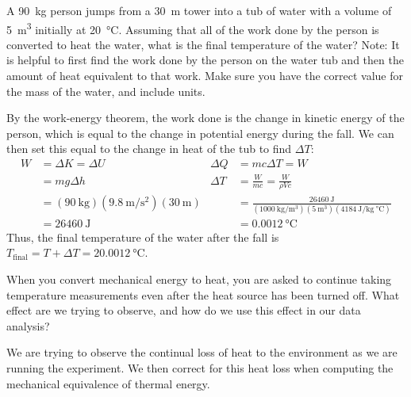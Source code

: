 \documentclass[addpoints]{physlabs}
\date{\today}
\begin{document}
\maketitle

\begin{prelab}

    \filbreak
    \question[1] A \qty{90}{\kilo\gram} person jumps from a \qty{30}{\meter} tower into a tub of water with a volume of \qty{5}{\meter^3} initially at \qty{20}{\celsius}. Assuming that all of the work done by the person is converted to heat the water, what is the final temperature of the water? Note: It is helpful to first find the work done by the person on the water tub and then the amount of heat equivalent to that work. Make sure you have the correct value for the mass of the water, and include units.
    \begin{solution}[8cm]
        By the work-energy theorem, the work done is the change in kinetic energy of the person, which is equal to the change in potential energy during the fall. We can then set this equal to the change in heat of the tub to find $\Delta T$:
        \begin{align*}
            W &= \Delta K=\Delta U & \Delta Q &= mc\Delta T = W
            \\
              &= mg\Delta h        & \Delta T &= \frac{W}{mc} = \frac{W}{\rho V c}
            \\
              &= (\qty{90}{\kilo\gram})(\qty{9.8}{\meter/\second^2})(\qty{30}{\meter})
              & &= \frac{\qty{26460}{\joule}}{(\qty{1000}{\kilo\gram/\meter^3})(\qty{5}{\meter^3})(\qty{4184}{\joule/\kilo\gram~\celsius})}
            \\
              &= \qty{26460}{\joule} & &= \qty{0.0012}{\celsius}
        \end{align*}
        Thus, the final temperature of the water after the fall is $T_\text{final}=T+\Delta T=\qty{20.0012}{\celsius}$.
        
    \end{solution}

    \filbreak
    \question[1] When you convert mechanical energy to heat, you are asked to continue taking temperature measurements even after the heat source has been turned off. What effect are we trying to observe, and how do we use this effect in our data analysis?
    \begin{solution}
        We are trying to observe the continual loss of heat to the environment as we are running the experiment. We then correct for this heat loss when computing the mechanical equivalence of thermal energy.
    \end{solution}

\end{prelab}
\end{document}
